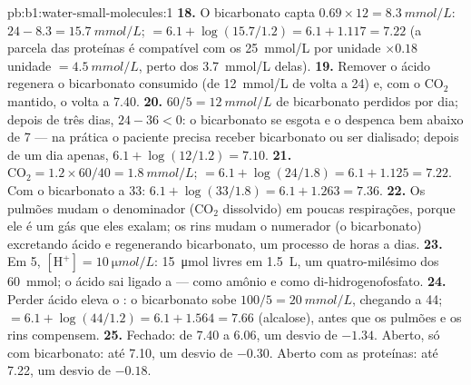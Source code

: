 \begin{solution}{pb:b1:water-small-molecules:1}
\textbf{18.} O bicarbonato capta $0.69\times 12 = \qty{8.3}{mmol/L}$:
$24 - 8.3 = \qty{15.7}{mmol/L}$;  $= 6.1 + \log(15.7/1.2) = 6.1 +
1.117 = 7.22$ (a parcela das proteínas é compatível com os
\qty{25}{mmol/L} por unidade $\times 0.18$ unidade $= \qty{4.5}{mmol/L}$,
perto dos \qty{3.7}{mmol/L} delas).
\textbf{19.} Remover o ácido regenera o bicarbonato consumido (de
\qty{12}{mmol/L} de volta a \qty{24}{}) e, com o $\mathrm{CO_2}$ mantido,
o  volta a 7.40.
\textbf{20.} $60/5 = \qty{12}{mmol/L}$ de bicarbonato perdidos por dia;
depois de três dias, $24 - 36 < 0$: o bicarbonato se esgota e o 
despenca bem abaixo de 7 --- na prática o paciente precisa receber
bicarbonato ou ser dialisado; depois de um dia apenas, $6.1 + \log(12/1.2) =
7.10$.
\textbf{21.} $\mathrm{CO_2} = 1.2\times 60/40 = \qty{1.8}{mmol/L}$;
 $= 6.1 + \log(24/1.8) = 6.1 + 1.125 = 7.22$. Com o bicarbonato a
\qty{33}{}: $6.1 + \log(33/1.8) = 6.1 + 1.263 = 7.36$.
\textbf{22.} Os pulmões mudam o denominador ($\mathrm{CO_2}$ dissolvido)
em poucas respirações, porque ele é um gás que eles exalam; os rins
mudam o numerador (o bicarbonato) excretando ácido e regenerando
bicarbonato, um processo de horas a dias.
\textbf{23.} Em  5, $[\mathrm{H^+}] = \qty{10}{\micro mol/L}$: \qty{15}{\micro mol} livres em \qty{1.5}{L}, um quatro-milésimo dos \qty{60}{mmol}; o ácido sai ligado a  --- como amônio e como di-hidrogenofosfato.
\textbf{24.} Perder ácido eleva o : o bicarbonato sobe
$100/5 = \qty{20}{mmol/L}$, chegando a \qty{44}{};  $= 6.1 + \log(44/1.2) =
6.1 + 1.564 = 7.66$ (alcalose), antes que os pulmões e os rins
compensem.
\textbf{25.} Fechado: de 7.40 a 6.06, um desvio de $-1.34$. Aberto, só
com bicarbonato: até 7.10, um desvio de $-0.30$. Aberto com as
proteínas: até 7.22, um desvio de $-0.18$.
\end{solution}
